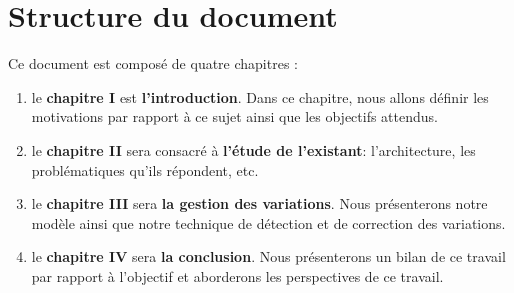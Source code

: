 \section{Structure du document}
Ce document est composé de quatre chapitres :
\begin{enumerate}
\item le \textbf{chapitre I} est \textbf{l'introduction}. Dans ce chapitre, nous allons définir les motivations  par rapport à ce sujet ainsi que les objectifs attendus. 
\item le \textbf{chapitre II} sera consacré à \textbf{l'étude de l'existant}: l'architecture, les problématiques qu'ils répondent, etc.
\item le  \textbf{chapitre III} sera \textbf{la gestion des variations}. Nous présenterons notre modèle ainsi que notre technique de détection et de correction des variations.
\item le  \textbf{chapitre IV} sera \textbf{la conclusion}. Nous présenterons un bilan de ce travail par rapport à l'objectif et aborderons les perspectives de ce travail.
\end{enumerate}


